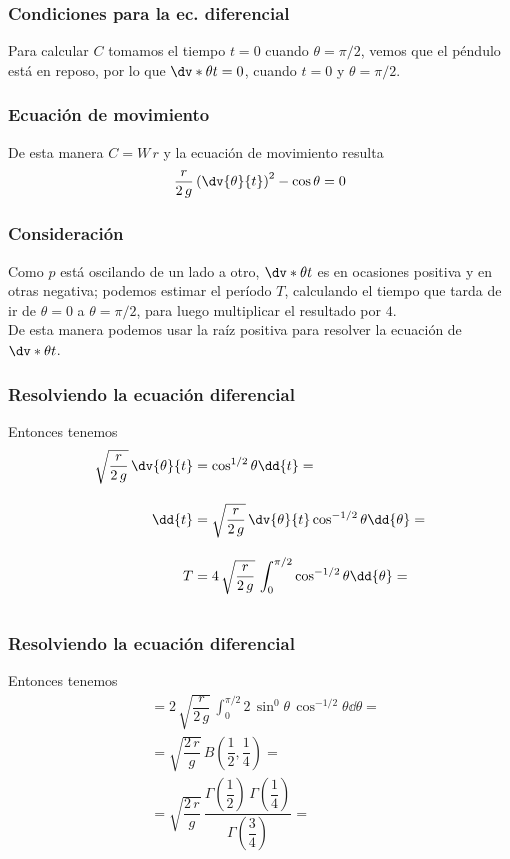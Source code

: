 \begin{frame}
\frametitle{Condiciones para la ec. diferencial}
Para calcular $C$ tomamos el tiempo $t = 0$ cuando $\theta = \pi/2$, vemos que el péndulo está en reposo, por lo que $\dv*{\theta}{t} = 0$, cuando $t = 0$ y $\theta = \pi/2$.
\end{frame}
\begin{frame}
\frametitle{Ecuación de movimiento}
De esta manera $C = W \, r$ y la ecuación de movimiento resulta
\begin{align*}
\dfrac{r}{2 \, g} \left( \dv{\theta}{t} \right)^{2} - \cos \theta = 0
\end{align*}
\end{frame}
\begin{frame}
\frametitle{Consideración}
Como $p$ está oscilando de un lado a otro, $\dv*{\theta}{t}$ es en ocasiones positiva y en otras negativa; podemos estimar el período $T$, calculando el tiempo que tarda de ir de $\theta=0$ a $\theta=\pi/2$, para luego multiplicar el resultado por $4$.
\\
\bigskip
\pause
De esta manera podemos usar la raíz positiva para resolver la ecuación de $\dv*{\theta}{t}$.
\end{frame}
\begin{frame}
\frametitle{Resolviendo la ecuación diferencial}
Entonces tenemos
\begin{align*}
\sqrt{\dfrac{r}{2 \, g}} \, \dv{\theta}{t} &= \cos^{1/2} \theta \dd{t} = \\[1em]
\dd{t} &= \sqrt{\dfrac{r}{2 \, g}} \, \dv{\theta}{t} \cos^{-1/2} \theta \dd{\theta} = \\[1em]
T &= 4 \, \sqrt{\dfrac{r}{2 \, g}} \, \int_{0}^{\pi/2} \cos^{-1/2} \theta \dd{\theta} = \\[1em]
\end{align*}
\end{frame}
\begin{frame}
\frametitle{Resolviendo la ecuación diferencial}
Entonces tenemos
\begin{align*}
&= 2 \, \sqrt{\dfrac{r}{2 \, g}} \, \int_{0}^{\pi/2} 2 \, \sin^{0} \theta \, \cos^{-1/2} \theta \dd{\theta} = \\[0.8em]
&= \sqrt{\dfrac{2 \, r}{g}} \, B \left( \dfrac{1}{2}, \dfrac{1}{4} \right) = \\[0.8em]
&= \sqrt{\dfrac{2 \, r}{g}} \, \dfrac{\Gamma \left(\dfrac{1}{2} \right) \, \Gamma \left(\dfrac{1}{4} \right)}{\Gamma \left(\dfrac{3}{4} \right)} = 
\end{align*}
\end{frame}
